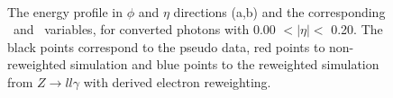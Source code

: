 \begin{figure}[htbp]
    \centering
	 \\
	\begin{tcolorbox}[colback=black!5!white,colframe=white!75!black]
    \caption{The energy profile in $\phi$ and $\eta$ directions (a,b) and the corresponding \Rphi \ and \Reta \ variables, for converted photons with 0.00 $ < |\eta| < $ 0.20. The black points correspond to the pseudo data, red points to non-reweighted simulation and blue points to the reweighted simulation from $Z\rightarrow ll\gamma$ with derived electron reweighting.}
    \label{Electron:3}
    \end{tcolorbox}
    
\end{figure}


